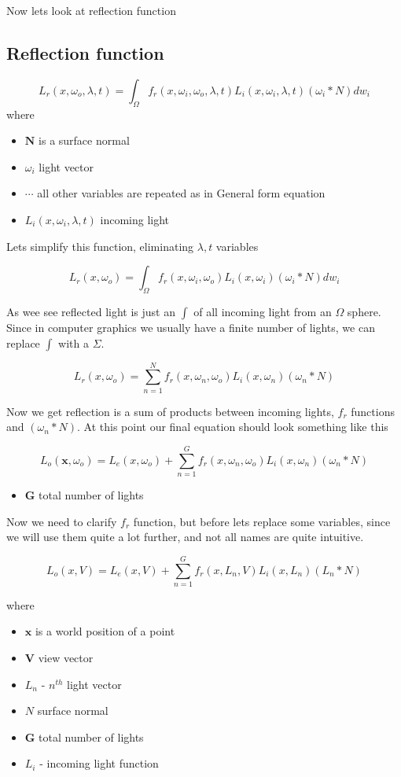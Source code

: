 \documentclass{article}
\begin{document}
Now lets look at reflection function

\subsection{Reflection function}
\[
L_{r}(x, \omega_{o}, \lambda, t) = \int _{\Omega } f_r(x, \omega_{i}, \omega_{o}, \lambda, t) L_{i}(x, \omega_{i}, \lambda, t) (\omega_{i} * N) dw_{i}
\]
where
\begin{itemize}
    \item $\textbf{N}$ is a surface normal
    \item $\omega_{i}$ light vector
    \item $\cdots$ all other variables are repeated as in General form equation
    \item $L_{i}(x, \omega_{i}, \lambda, t)$ incoming light 
\end{itemize}

Lets simplify this function, eliminating $\lambda, t$ variables

\[
L_{r}(x, \omega_{o}) = \int _{\Omega } f_r(x, \omega_{i}, \omega_{o}) L_{i}(x, \omega_{i}) (\omega_{i} * N) dw_{i}
\]


As wee see reflected light is just an $\int$ of all incoming light from an $\Omega$ 
sphere. Since in computer graphics we usually have a finite number of lights, we can replace $\int$ with a $\Sigma$.

\begin{equation}
    L_{r}(x, \omega_{o}) = \sum_{n = 1}^{N} f_r(x, \omega_{n}, \omega_{o}) L_{i}(x, \omega_{n}) (\omega_{n} * N)
\end{equation}

Now we get reflection is a sum of products between incoming lights, $f_r$ functions and $(\omega_{n} * N)$. 
At this point our final equation should look something like this

\[
L_{o}(\textbf{x}, \omega_{o}) = L_{e}(x, \omega_{o}) + \sum_{n = 1}^{G} f_r(x, \omega_{n}, \omega_{o}) L_{i}(x, \omega_{n}) (\omega_{n} * N)
\]
\begin{itemize}
    \item $\textbf{G}$ total number of lights
\end{itemize}

Now we need to clarify $f_r$ function, but before lets replace some variables, 
since we will use them quite a lot further, and not all names are quite intuitive.

\begin{equation}
    L_{o}(x, V) = L_{e}(x, V) + \sum_{n = 1}^{G} f_r(x, L_{n}, V) L_{i}(x, L_{n}) (L_{n} * N)
\end{equation}

where
\begin{itemize}
    \item $\textbf{x}$ is a world position of a point
    \item $\textbf{V}$ view vector
    \item $L_{n}$ - $n^{th}$ light vector
    \item $N$ surface normal
    \item $\textbf{G}$ total number of lights
    \item $L_{i}$ - incoming light function
\end{itemize}
\end{document}
